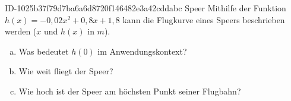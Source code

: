 \begin{exercise}
      {ID-1025b37f79d7ba6a6d8720f146482e3a42cddabc}
      {Speer}
  \ifproblem\problem
    Mithilfe der Funktion $h(x)=-0,\!02x^{2}+0,\!8x+1,\!8$ kann die Flugkurve
    eines Speers beschrieben werden ($x$ und $h(x)$ in $m$).
    \begin{enumerate}[a)]
      \item Was bedeutet $h(0)$ im Anwendungskontext?
      \item Wie weit fliegt der Speer?
      \item Wie hoch ist der Speer am höchsten Punkt seiner Flugbahn?
    \end{enumerate}
  \fi
\end{exercise}
